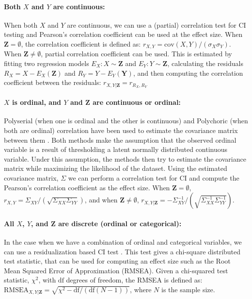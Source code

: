 \documentclass{uai2025} %
\begin{document}
\paragraph{Both $ X $ and $ Y $ are continuous: }
When both $ X $ and $ Y $ are continuous, we can use a (partial) correlation
test for CI testing and Pearson's correlation coefficient can be used at the
effect size. When $ \bm{Z} = \emptyset $, the correlation coefficient is
defined as: $ r_{X, Y} = \mathrm{cov}(X, Y) / (\sigma_X \sigma_Y) $. When $
\bm{Z} \neq \emptyset $, partial correlation coefficient can be used. This is
estimated by fitting two regression models $ E_X: X \sim \bm{Z} $ and $ E_Y: Y
\sim \bm{Z} $, calculating the residuals $ R_X = X - E_X(\bm{Z}) $ and $ R_Y =
Y - E_Y(\bm{Y}) $, and then computing the correlation coefficient between the
residuals: $r_{X, Y \rvert \bm{Z}} = r_{R_X, R_Y}$

\paragraph{$ X $ is ordinal, and $ Y $ and $ \bm{Z} $  are continuous or ordinal: }

Polyserial (when one is ordinal and the other is continuous) and Polychoric
(when both are ordinal) correlation have been used to estimate the covariance
matrix between them \citep{Poon1987}. Both methods make the assumption that the
observed ordinal variable is a result of thresholding a latent normally
distributed continuous variable. Under this assumption, the methods then try to
estimate the covariance matrix while maximizing the likelihood of the dataset.
Using the estimated covariance matrix, $ \Sigma $ we can perform a correlation
test for CI and compute the Pearson's correlation coefficient as the effect
size. When 
$\bm{Z} = \emptyset $, $ r_{X, Y} = \Sigma_{XY} / (\sqrt{\Sigma_{XX} \Sigma_{YY}}) $, 
	and when $ \bm{Z} \ne \emptyset $,
	$ r_{X, Y \rvert \bm{Z}} = - \Sigma^{-1}_{XY}/ (\sqrt{\Sigma^{-1}_{XX} \Sigma^{-1}_{YY}}) $.

\paragraph{All $ X $, $ Y $, and $ \bm{Z} $ are discrete (ordinal or categorical): }

In the case when we have a combination of ordinal and categorical variables, we
can use a residualization based CI test \citep{Ankan2023}. This test gives a
chi-square distributed test statistic, that can be used for computing an effect
size such as the Root Mean Squared Error of Approximation (RMSEA). Given a
chi-squared test statistic, $ \chi^2 $, with $ \textrm{df} $ degrees of
freedom, the RMSEA is defined as: $ \textrm{RMSEA}_{X, Y \rvert \bm{Z}} =
\sqrt{\chi^2 - \textrm{df}/ (\textrm{df} (N-1))} $, where $ N $ is the sample
size.
\end{document}
